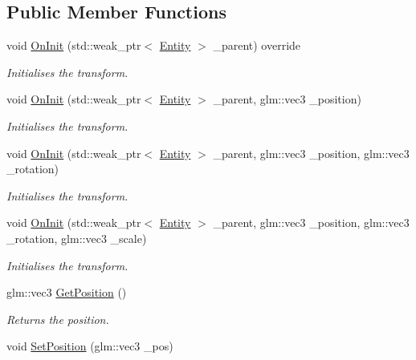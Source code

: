 \subsection*{Public Member Functions}
\begin{DoxyCompactItemize}
\item 
void \hyperlink{classfrontier_1_1_transform_a2d8181ec0003b04822124340fe7772c0}{On\+Init} (std\+::weak\+\_\+ptr$<$ \hyperlink{classfrontier_1_1_entity}{Entity} $>$ \+\_\+parent) override
\begin{DoxyCompactList}\small\item\em Initialises the transform. \end{DoxyCompactList}\item 
void \hyperlink{classfrontier_1_1_transform_a939611da70fc0f33b85fcf92d101ac3e}{On\+Init} (std\+::weak\+\_\+ptr$<$ \hyperlink{classfrontier_1_1_entity}{Entity} $>$ \+\_\+parent, glm\+::vec3 \+\_\+position)
\begin{DoxyCompactList}\small\item\em Initialises the transform. \end{DoxyCompactList}\item 
void \hyperlink{classfrontier_1_1_transform_ab23c1b75f7a02947bddec97abe286fa3}{On\+Init} (std\+::weak\+\_\+ptr$<$ \hyperlink{classfrontier_1_1_entity}{Entity} $>$ \+\_\+parent, glm\+::vec3 \+\_\+position, glm\+::vec3 \+\_\+rotation)
\begin{DoxyCompactList}\small\item\em Initialises the transform. \end{DoxyCompactList}\item 
void \hyperlink{classfrontier_1_1_transform_a8d2f5d6830818cc167a94948a15b2697}{On\+Init} (std\+::weak\+\_\+ptr$<$ \hyperlink{classfrontier_1_1_entity}{Entity} $>$ \+\_\+parent, glm\+::vec3 \+\_\+position, glm\+::vec3 \+\_\+rotation, glm\+::vec3 \+\_\+scale)
\begin{DoxyCompactList}\small\item\em Initialises the transform. \end{DoxyCompactList}\item 
glm\+::vec3 \hyperlink{classfrontier_1_1_transform_a9807f56b882736521e5678853e8a09c5}{Get\+Position} ()
\begin{DoxyCompactList}\small\item\em Returns the position. \end{DoxyCompactList}\item 
void \hyperlink{classfrontier_1_1_transform_a45f9ecc9db02d813f49211cdd71ec749}{Set\+Position} (glm\+::vec3 \+\_\+pos)

\end{DoxyCompactItemize}
